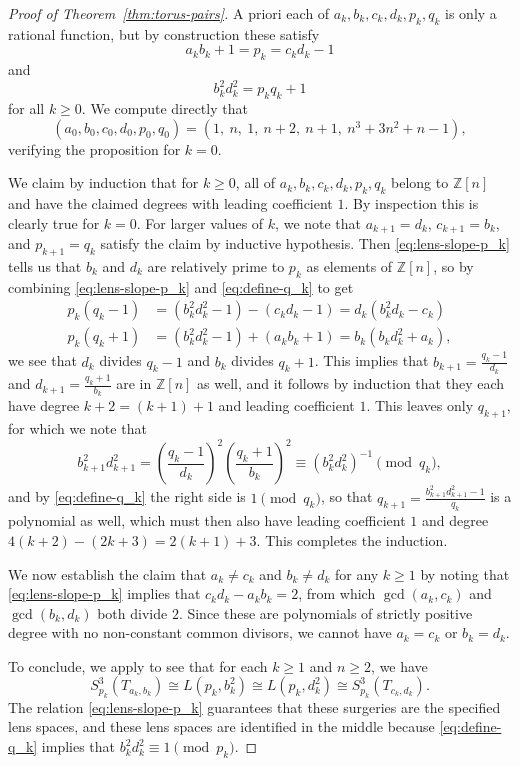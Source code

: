 \documentclass[11pt]{amsart}
\numberwithin{equation}{section}
\numberwithin{theorem}{section}
\theoremstyle{definition}
\newcommand{\Z}{\mathbb{Z}}
\begin{document}
\begin{proof}[Proof of Theorem~\ref{thm:torus-pairs}]
A priori each of $a_k,b_k,c_k,d_k,p_k,q_k$ is only a rational function, but by construction these satisfy
\begin{equation} \label{eq:lens-slope-p_k}
a_k b_k + 1 = p_k = c_k d_k - 1
\end{equation}
and
\begin{equation} \label{eq:define-q_k}
b_k^2d_k^2 = p_k q_k + 1
\end{equation}
for all $k \geq 0$.  We compute directly that
\[ (a _0,b _0,c _0,d _0,p _0,q _0) = (1,\ n,\ 1,\ n+2,\ n+1,\ n^3+3n^2+n-1), \]
verifying the proposition for $k=0$.

We claim by induction that for $k\geq 0$, all of $a_k, b_k, c_k, d_k, p_k, q_k$ belong to $\Z[n]$ and have the claimed degrees with leading coefficient $1$.  By inspection this is clearly true for $k=0$.  For larger values of $k$, we note that $a_{k+1} = d_k$, $c_{k+1} = b_k$, and $p_{k+1} = q_k$ satisfy the claim by inductive hypothesis.  Then \eqref{eq:lens-slope-p_k} tells us that $b_k$ and $d_k$ are relatively prime to $p_k$ as elements of $\Z[n]$, so by combining \eqref{eq:lens-slope-p_k} and \eqref{eq:define-q_k} to get
\begin{align*}
p_k(q_k-1) &= (b_k^2d_k^2-1) - (c_kd_k-1) = d_k(b_k^2d_k-c_k) \\
p_k(q_k+1) &= (b_k^2d_k^2-1) + (a_kb_k+1) = b_k(b_kd_k^2+a_k),
\end{align*}
we see that $d_k$ divides $q_k-1$ and $b_k$ divides $q_k+1$.  This implies that $b_{k+1} = \frac{q_k-1}{d_k}$ and $d_{k+1} = \frac{q_k+1}{b_k}$ are in $\Z[n]$ as well, and it follows by induction that they each have degree $k+2 = (k+1)+1$ and leading coefficient $1$.  This leaves only $q_{k+1}$, for which we note that
\[ b_{k+1}^2 d_{k+1}^2 = \left(\frac{q_k-1}{d_k}\right)^2 \left(\frac{q_k+1}{b_k}\right)^2 \equiv (b_k^2d_k^2)^{-1} \pmod{q_k}, \]
and by \eqref{eq:define-q_k} the right side is $1\pmod{q_k}$, so that $q_{k+1} = \frac{b_{k+1}^2d_{k+1}^2 - 1}{q_k}$ is a polynomial as well, which must then also have leading coefficient $1$ and degree $4(k+2)-(2k+3) = 2(k+1)+3$.  This completes the induction.

We now establish the claim that $a_k \neq c_k$ and $b_k \neq d_k$ for any $k\geq 1$ by noting that \eqref{eq:lens-slope-p_k} implies that $c_kd_k - a_kb_k = 2$, from which $\gcd(a_k,c_k)$ and $\gcd(b_k,d_k)$ both divide $2$.  Since these are polynomials of strictly positive degree with no non-constant common divisors, we cannot have $a_k = c_k$ or $b_k = d_k$.

To conclude, we apply \cite{moser} to see that for each $k\geq 1$ and $n \geq 2$, we have
\[ S^3_{p_k}(T_{a_k,b_k}) \cong L(p_k,b_k^2) \cong L(p_k,d_k^2) \cong S^3_{p_k}(T_{c_k,d_k}). \]
The relation \eqref{eq:lens-slope-p_k} guarantees that these surgeries are the specified lens spaces, and these lens spaces are identified in the middle because \eqref{eq:define-q_k} implies that $b_k^2d_k^2 \equiv 1 \pmod{p_k}$.
\end{proof}
\end{document}
